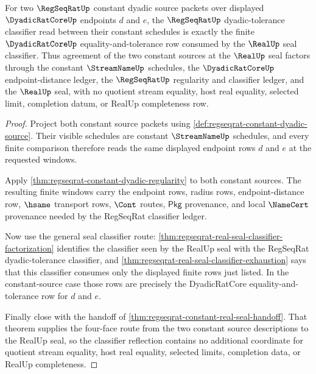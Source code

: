 \begin{theorem}
\label{thm:regseqrat-constant-dyadic-classifier-reflection}
For two $\RegSeqRatUp$ constant dyadic source packets over displayed
$\DyadicRatCoreUp$ endpoints $d$ and $e$, the $\RegSeqRatUp$
dyadic-tolerance classifier read between their constant schedules is exactly
the finite $\DyadicRatCoreUp$ equality-and-tolerance row consumed by the
$\RealUp$ seal classifier. Thus agreement of the two constant sources at the
$\RealUp$ seal factors through the constant $\StreamNameUp$ schedules, the
$\DyadicRatCoreUp$ endpoint-distance ledger, the $\RegSeqRatUp$ regularity and
classifier ledger, and the $\RealUp$ seal, with no quotient stream equality,
host real equality, selected limit, completion datum, or RealUp completeness
row.
\end{theorem}
\begin{proof}
Project both constant source packets using
\autoref{def:regseqrat-constant-dyadic-source}. Their visible schedules are
constant $\StreamNameUp$ schedules, and every finite comparison therefore
reads the same displayed endpoint rows $d$ and $e$ at the requested windows.

Apply \autoref{thm:regseqrat-constant-dyadic-regularity} to both constant
sources. The resulting finite windows carry the endpoint rows, radius rows,
endpoint-distance row, $\hsame$ transport rows, $\Cont$ routes,
$\mathsf{Pkg}$ provenance, and local $\NameCert$ provenance needed by the
RegSeqRat classifier ledger.

Now use the general seal classifier route:
\autoref{thm:regseqrat-real-seal-classifier-factorization} identifies the
classifier seen by the RealUp seal with the RegSeqRat dyadic-tolerance
classifier, and
\autoref{thm:regseqrat-real-seal-classifier-exhaustion} says that this
classifier consumes only the displayed finite rows just listed. In the
constant-source case those rows are precisely the DyadicRatCore
equality-and-tolerance row for $d$ and $e$.

Finally close with the handoff of
\autoref{thm:regseqrat-constant-real-seal-handoff}. That theorem supplies the
four-face route from the two constant source descriptions to the RealUp seal,
so the classifier reflection contains no additional coordinate for quotient
stream equality, host real equality, selected limits, completion data, or
RealUp completeness.
\end{proof}

